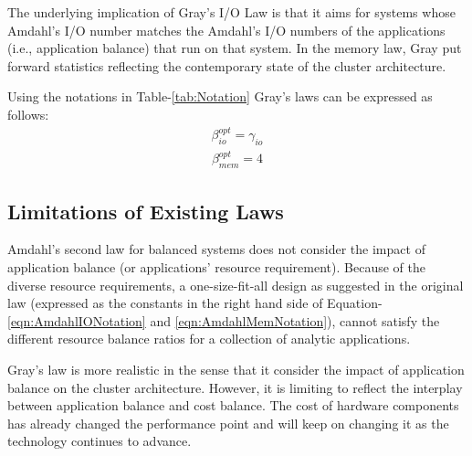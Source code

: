 \documentclass[journal]{IEEEtran}
\begin{document}
The underlying implication of Gray's I/O Law is that it aims for systems whose Amdahl's I/O number  matches the Amdahl's I/O  numbers of the applications (i.e., application balance) that run on that system. In the memory law, Gray put forward statistics reflecting the contemporary state of the cluster architecture. 

Using the notations in Table-\ref{tab:Notation} Gray's laws can be expressed as follows:
\begin{equation} \label{eqn:GrayIONotation}
\begin{split}
\beta_{io}^{opt} = \gamma_{io}
\end{split}
\end{equation}
\begin{equation} \label{eqn:GrayMemNotation}
\begin{split}
\beta_{mem}^{opt} = 4
\end{split}
\end{equation}

\subsection{Limitations of Existing Laws}
Amdahl's second law for balanced systems does not consider the impact of application balance (or applications' resource requirement). Because of the diverse resource requirements, a one-size-fit-all design as suggested in the original law (expressed as the constants in the right hand side of Equation-\ref{eqn:AmdahlIONotation} and \ref{eqn:AmdahlMemNotation}), cannot satisfy the different resource balance ratios for a collection of analytic applications. 

Gray's law is more realistic in the sense that it consider the impact of application balance on the cluster architecture.  However, it is limiting to reflect the interplay between application balance and cost balance. The cost of hardware components has already changed the performance point and will keep on changing it as the technology continues to advance. 
\end{document}
